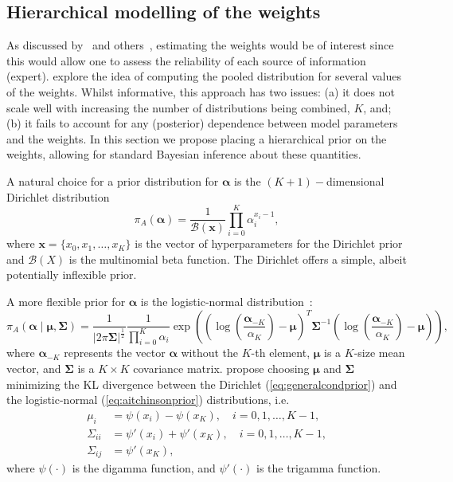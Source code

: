 \documentclass[12pt]{article}
\begin{document}
\subsection{Hierarchical modelling of the weights}
\label{sec:hierPrior}

As discussed by~\textcite{Poole2000} and others~\parencite{Zhong2015,Li2017}, estimating the weights would be of interest since this would allow one to assess the reliability of each source of information (expert).
\textcite{Li2017} explore the idea of computing the pooled distribution for several values of the weights.
Whilst informative, this approach has two issues: (a) it does not scale well with increasing the number of distributions being combined, $K$, and; (b) it fails to account for any (posterior) dependence between model parameters and the weights.
In this section we propose placing a hierarchical prior on the weights, allowing for standard Bayesian inference about these quantities.

A natural choice for a prior distribution for $\boldsymbol\alpha$ is the $(K+1)-$dimensional Dirichlet distribution
\begin{equation}
 \label{eq:generalcondprior}
 \pi_A(\boldsymbol\alpha) = \frac{1}{\mathcal{B}(\boldsymbol x)}\prod_{i=0}^K \alpha_i^{x_i-1},
\end{equation}
where $\boldsymbol x = \{ x_0, x_1, \ldots, x_K\}$ is the vector of hyperparameters for the Dirichlet prior and $\mathcal{B}(X)$ is the multinomial beta function.
The Dirichlet offers a simple, albeit potentially inflexible prior.

A more flexible prior for $\boldsymbol\alpha$ is the logistic-normal distribution~\parencite{Aitchson1980}:
\begin{equation}
 \label{eq:aitchinsonprior}
 \pi_A(\boldsymbol\alpha \mid \boldsymbol \mu, \boldsymbol \Sigma) = \frac{1}{|2\pi \boldsymbol \Sigma|^{\frac{1}{2}}}\frac{1}{\prod_{i=0}^K \alpha_i}
  \exp\left(
     \left(\log\left(\frac{\boldsymbol \alpha_{-K}}{\alpha_K}\right) - \boldsymbol \mu\right)^T
     {\boldsymbol \Sigma}^{-1}
     \left(\log\left(\frac{\boldsymbol \alpha_{-K}}{\alpha_K}\right) - \boldsymbol \mu\right)
     \right),
\end{equation}
where $\boldsymbol \alpha_{-K}$ represents the vector $\boldsymbol \alpha$ without the $K$-th element, $\boldsymbol \mu$ is a $K$-size mean vector, and $\boldsymbol \Sigma$ is a $K \times K$ covariance matrix.
\parencite{Aitchson1980} propose choosing $\boldsymbol \mu$ and $\boldsymbol \Sigma$ minimizing the KL divergence between the Dirichlet (\ref{eq:generalcondprior}) and the logistic-normal (\ref{eq:aitchinsonprior}) distributions, i.e.
\begin{align}
 \label{eq:momentmatching}
 \mu_i & = \psi(x_i) - \psi(x_K), \quad i=0,1,\ldots,K-1, \\
 \Sigma_{ii} & = \psi'(x_i) + \psi'(x_K), \quad i=0,1,\ldots,K-1, \\
 \Sigma_{ij} & = \psi'(x_K),
\end{align}
where $\psi(\cdot)$ is the digamma function, and $\psi'(\cdot)$ is the trigamma function.
\end{document}
